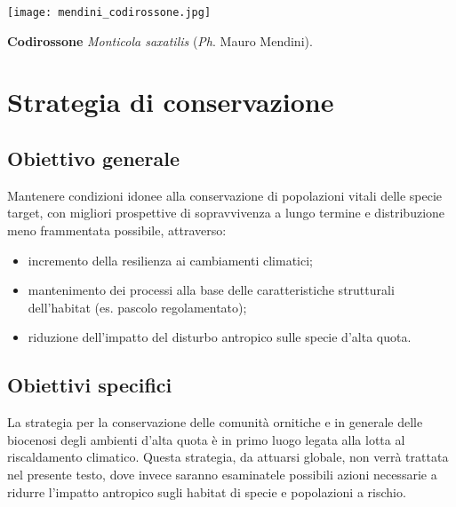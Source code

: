 \documentclass[10pt,twoside,openany,x11names,svgnames,italian,a5paper,dvipsnames,table]{memoir}
\newcommand\chapterillustration{}
\newcommand{\ph}{\emph{Ph}. }
\begin{document}
\vspace*{\fill}
\begin{center}
\texttt{[image: mendini\_codirossone.jpg]}
\end{center}
\caption*{\textbf{Codirossone} \emph{Monticola saxatilis} (\ph Mauro Mendini).}
\vspace*{\fill}

\chapter{Strategia di conservazione}
\renewcommand\chapterillustration{4.JPG}

\section{Obiettivo generale} 
Mantenere condizioni idonee alla conservazione di popolazioni vitali delle specie target, con migliori prospettive di sopravvivenza a lungo termine e distribuzione meno frammentata possibile, attraverso:
\begin{itemize}\itemsep0pt
  \item incremento della resilienza ai cambiamenti climatici;
  \item mantenimento dei processi alla base delle caratteristiche strutturali dell’habitat (es. pascolo regolamentato);
  \item riduzione dell’impatto del disturbo antropico sulle specie d’alta quota.
\end{itemize}

\section{Obiettivi specifici}
La strategia per la conservazione delle comunità ornitiche e in generale delle biocenosi degli ambienti d’alta quota è in primo luogo legata alla lotta al riscaldamento climatico. Questa strategia, da attuarsi globale, non verrà trattata nel presente testo, dove invece saranno esaminatele possibili azioni necessarie a ridurre l'impatto antropico sugli habitat di specie e popolazioni a rischio.
\end{document}
